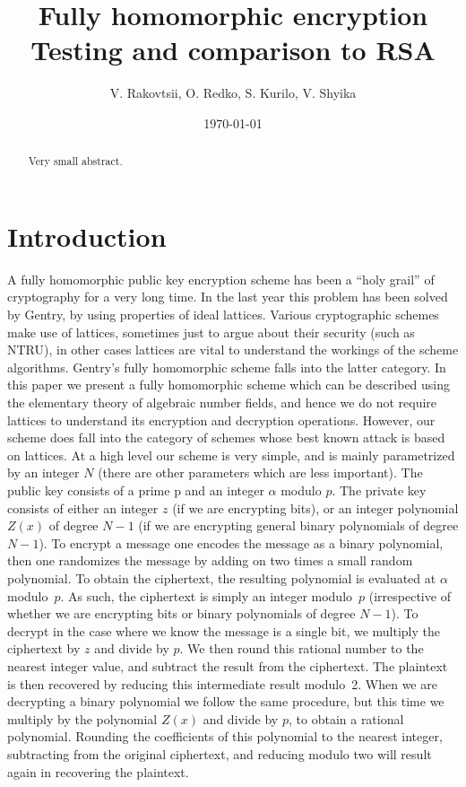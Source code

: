 \documentclass[a4paper, 12pt]{article}
\title{Fully homomorphic encryption \\ \vspace{2 mm} {\large Testing and comparison to RSA}}
\author{V. Rakovtsii, O. Redko, S. Kurilo, V. Shyika}
\date{\today}
\begin{document}
	
	\clearpage
	\maketitle
	\thispagestyle{empty}
	
	
	\clearpage
	\thispagestyle{empty}
	\begin{abstract}
	Very small abstract.
	\end{abstract}
	
	
	\tableofcontents
	
	
	\section{Introduction}

	A fully homomorphic public key encryption scheme has been a “holy grail” of cryptography for a very long time.
	In the last year this problem has been solved by Gentry, by using properties of ideal lattices. Various cryptographic schemes make use of lattices, sometimes just to argue about their security (such as NTRU), in other cases lattices are vital to understand the workings of the scheme algorithms. Gentry’s fully homomorphic scheme falls into the latter category.
	In this paper we present a fully homomorphic scheme which can be described using the elementary theory of algebraic number fields, and hence we do not require lattices to understand its encryption and decryption operations. However, our scheme does fall into the category of schemes whose best known attack is based on lattices.
	At a high level our scheme is very simple, and is mainly parametrized by an integer $N$ (there are other parameters which are less important). The public key consists of a prime p and an integer $\alpha$ modulo $p$.
	The private key consists of either an integer $z$ (if we are encrypting bits), or an integer polynomial $Z(x)$ of degree $N - 1$ (if we are encrypting general binary polynomials of degree $N - 1$).
	To encrypt a message one encodes the message as a binary polynomial, then one randomizes the message by adding on two times a small random polynomial.
	To obtain the ciphertext, the resulting polynomial is evaluated at $\alpha$ modulo~$p$.
	As such, the ciphertext is simply an integer modulo~$p$ (irrespective of whether we are encrypting bits or binary polynomials of degree $N - 1$).
	To decrypt in the case where we know the message is a single bit, we multiply the ciphertext by $z$ and divide by $p$. We then round this rational number to the nearest integer value, and subtract the result from the ciphertext. 
	The plaintext is then recovered by reducing this intermediate result modulo~2. 
	When we are decrypting a binary polynomial we follow the same procedure, but this time we multiply by the polynomial $Z(x)$ and divide by $p$, to obtain a rational polynomial. 
	Rounding the coefficients of this polynomial to the nearest integer, subtracting from the original ciphertext, and reducing modulo two will result again in recovering the plaintext.
	
\end{document}
